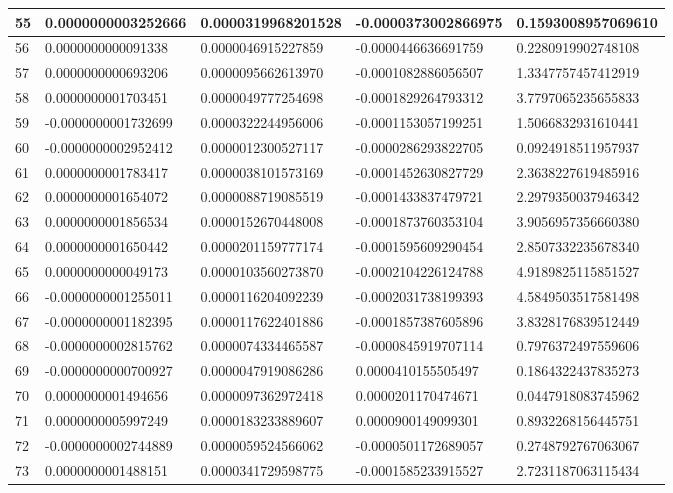 \begin{center}
\begin{longtable}{|p{0.5cm}|p{3.5cm}|p{3.5cm}|p{3.5cm}|p{3.5cm}|}
\hline
55  & 0.0000000003252666  & 0.0000319968201528  & -0.0000373002866975  & 0.1593008957069610\\
\hline
56  & 0.0000000000091338  & 0.0000046915227859  & -0.0000446636691759  & 0.2280919902748108\\
\hline
57  & 0.0000000000693206  & 0.0000095662613970  & -0.0001082886056507  & 1.3347757457412919\\
\hline
58  & 0.0000000001703451  & 0.0000049777254698  & -0.0001829264793312  & 3.7797065235655833\\
\hline
59  & -0.0000000001732699  & 0.0000322244956006  & -0.0001153057199251  & 1.5066832931610441\\
\hline
60  & -0.0000000002952412  & 0.0000012300527117  & -0.0000286293822705  & 0.0924918511957937\\
\hline
61  & 0.0000000001783417  & 0.0000038101573169  & -0.0001452630827729  & 2.3638227619485916\\
\hline
62  & 0.0000000001654072  & 0.0000088719085519  & -0.0001433837479721  & 2.2979350037946342\\
\hline
63  & 0.0000000001856534  & 0.0000152670448008  & -0.0001873760353104  & 3.9056957356660380\\
\hline
64  & 0.0000000001650442  & 0.0000201159777174  & -0.0001595609290454  & 2.8507332235678340\\
\hline
65  & 0.0000000000049173  & 0.0000103560273870  & -0.0002104226124788  & 4.9189825115851527\\
\hline
66  & -0.0000000001255011  & 0.0000116204092239  & -0.0002031738199393  & 4.5849503517581498\\
\hline
67  & -0.0000000001182395  & 0.0000117622401886  & -0.0001857387605896  & 3.8328176839512449\\
\hline
68  & -0.0000000002815762  & 0.0000074334465587  & -0.0000845919707114  & 0.7976372497559606\\
\hline
69  & -0.0000000000700927  & 0.0000047919086286  & 0.0000410155505497  & 0.1864322437835273\\
\hline
70  & 0.0000000001494656  & 0.0000097362972418  & 0.0000201170474671  & 0.0447918083745962\\
\hline
71  & 0.0000000005997249  & 0.0000183233889607  & 0.0000900149099301  & 0.8932268156445751\\
\hline
72  & -0.0000000002744889  & 0.0000059524566062  & -0.0000501172689057  & 0.2748792767063067\\
\hline
73  & 0.0000000001488151  & 0.0000341729598775  & -0.0001585233915527  & 2.7231187063115434\\

\end{longtable}
\end{center}
